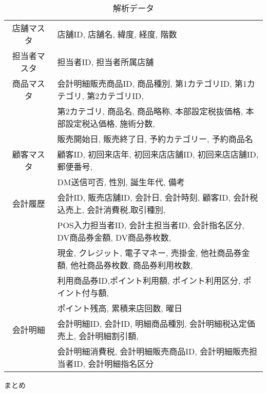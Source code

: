 \documentclass[a4j,11pt]{jarticle}
\makeatletter
\def\section{\@startsection{section}{1}{\z@}
   {0.8\Cvs \@plus.5\Cdp \@minus.2\Cdp}
   {0.2\Cvs \@plus.3\Cdp}
   {\normalfont \Large \bfseries}}
\makeatother
\begin{document}
\begin{table}[H]
\begin{center}
\caption{解析データ}   %
\label{hairdata}   %
\begin{tabular}{c l}
\hline
店舗マスタ & 店舗ID, 店舗名, 緯度, 経度, 階数 \\

担当者マスタ　& 担当者ID, 担当者所属店舗 \\

商品マスタ & 会計明細販売商品ID, 商品種別,  第1カテゴリID, 第1カテゴリ, 第2カテゴリID, \\
               &  第2カテゴリ, 商品名, 商品略称, 本部設定税抜価格, 本部設定税込価格, 施術分数, \\
               & 販売開始日, 販売終了日, 予約カテゴリー, 予約商品名\\

顧客マスタ & 顧客ID, 初回来店年, 初回来店店舗ID, 初回来店店舗ID, 郵便番号, \\
              & DM送信可否, 性別, 誕生年代, 備考 \\

会計履歴 & 会計ID, 販売店舗ID, 会計日, 会計時刻, 顧客ID, 会計税込売上, 会計消費税,取引種別, \\
             &  POS入力担当者ID, 会計主担当者ID, 会計指名区分, DV商品券金額, DV商品券枚数,\\
             &  現金, クレジット, 電子マネー, 売掛金, 他社商品券金額, 他社商品券枚数, 商品券利用枚数, \\
             &  利用商品券ID,ポイント利用額, ポイント利用区分, ポイント付与額, \\
            &  ポイント残高, 累積来店回数, 曜日\\

会計明細 & 会計明細ID, 会計ID, 明細商品種別, 会計明細税込定価売上, 会計明細割引額, \\
              & 会計明細消費税, 会計明細販売商品ID, 会計明細販売担当者ID, 会計明細指名区分 \\
\hline
\end{tabular}
\end{center}
\end{table}

\section{まとめ}

{} %




\end{document}
